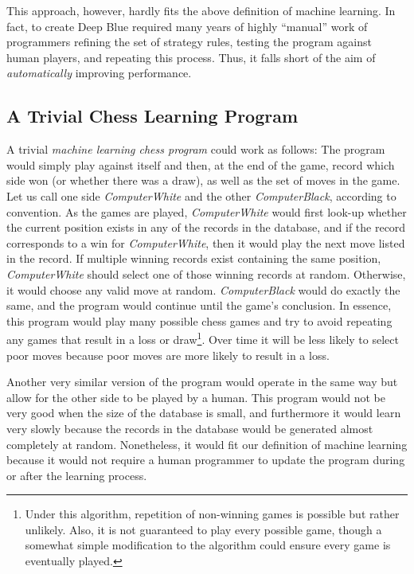 This approach, however, hardly fits the above definition of machine learning. In fact, to create Deep Blue required many years of highly ``manual'' work of programmers refining the set of strategy rules, testing the program against human players, and repeating this process. Thus, it falls short of the aim of \emph{automatically} improving performance.

\subsection{A Trivial Chess Learning Program}
\label{sec:trivial-learning}

A trivial \emph{machine learning chess program} could work as follows: The program would simply play against itself and then, at the end of the game, record which side won (or whether there was a draw), as well as the set of moves in the game. Let us call one side \emph{ComputerWhite} and the other \emph{ComputerBlack}, according to convention. As the games are played, \emph{ComputerWhite} would first look-up whether the current position exists in any of the records in the database, and if the record corresponds to a win for \emph{ComputerWhite}, then it would play the next move listed in the record. If multiple winning records exist containing the same position, \emph{ComputerWhite} should select one of those winning records at random.  Otherwise, it would choose any valid move at random. \emph{ComputerBlack} would do exactly the same, and the program would continue until the game's conclusion. In essence, this program would play many possible chess games and try to avoid repeating any games that result in a loss or draw\footnote{Under this algorithm, repetition of non-winning games is possible but rather unlikely. Also, it is not guaranteed to play every possible game, though a somewhat simple modification to the algorithm could ensure every game is eventually played.}. Over time it will be less likely to select poor moves because poor moves are more likely to result in a loss.

Another very similar version of the program would operate in the same way but allow for the other side to be played by a human. This program would not be very good when the size of the database is small, and furthermore it would learn very slowly because the records in the database would be generated almost completely at random. Nonetheless, it would fit our definition of machine learning because it would not require a human programmer to update the program during or after the learning process.

